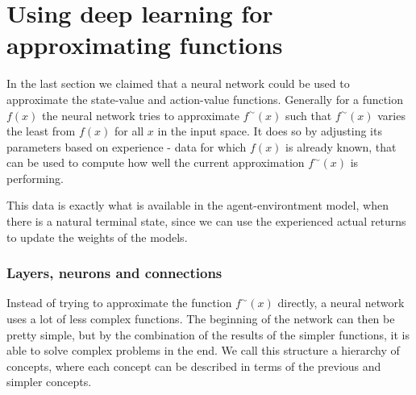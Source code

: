 \documentclass[11pt]{article}
\begin{document}
\maketitle

\section{Using deep learning for approximating functions}\label{sec:deep_learning}

In the last section we claimed that a neural network could be used to approximate the
state-value and action-value functions.
Generally for a function $f(x)$ the neural network tries to approximate $f^\sim(x)$
such that $f^\sim(x)$ varies the least from $f(x)$ for all $x$ in the input space\cite{DeepLearningBook}.
It does so by adjusting its parameters based on experience - data for which $f(x)$ is already known,
that can be used to compute how well the current approximation $f^\sim(x)$ is performing.

This data is exactly what is available in the agent-environtment model, when there is a natural terminal state,
since we can use the experienced actual returns to update the weights of the models.

\subsubsection{Layers, neurons and connections}

Instead of trying to approximate the function $f^\sim(x)$ directly,
a neural network uses a lot of less complex functions.
The beginning of the network can then be pretty simple, but by the combination of the results of
the simpler functions, it is able to solve complex problems in the end.
We call this structure a hierarchy of concepts, where each concept can be described in terms
of the previous and simpler concepts\cite{DeepLearningBook}.
\end{document}
